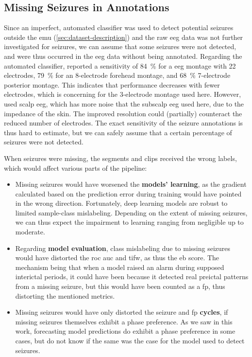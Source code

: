 \subsection{Missing Seizures in Annotations}
Since an imperfect, automated classifier was used to detect potential seizures outside the \gls{emu} (\cref{sec:dataset-description}) and the raw \gls{eeg} data was not further investigated for seizures, we can assume that some seizures were not detected, and were thus occurred in the \gls{eeg} data without being annotated.
Regarding the automated classifier, \textcite{furbass_automatic_2017} reported a sensitivity of \SI{84}{\percent} for a \gls{eeg} montage with 22 electrodes, \SI{79}{\percent} for an 8-electrode forehead montage, and \SI{68}{\percent} 7-electrode posterior montage.
This indicates that performance decreases with fewer electrodes, which is concerning for the 3-electrode montage used here.
However, \textcite{furbass_automatic_2017} used scalp \gls{eeg}, which has more noise that the subscalp \gls{eeg} used here, due to the impedance of the skin.
The improved resolution could (partially) counteract the reduced number of electrodes.
The exact sensitivity of the seizure annotations is thus hard to estimate, but we can safely assume that a certain percentage of seizures were not detected.

When seizures were missing, the segments and clips received the wrong labels, which would affect various parts of the pipeline:

\begin{itemize}
    \item Missing seizures would have worsened the \textbf{models' learning}, as the gradient calculated based on the prediction error during training would have pointed in the wrong direction.
    Fortunately, deep learning models are robust to limited sample-class mislabeling.
    Depending on the extent of missing seizures, we can thus expect the impairment to learning ranging from negligible up to moderate.

    \item Regarding \textbf{model evaluation}, class mislabeling due to missing seizures would have distorted the \gls{roc auc} and \gls{tifw}, as thus the \gls{eb} score.
    The mechanism being that when a model raised an alarm during supposed interictal periods, it could have been because it detected real preictal patterns from a missing seizure, but this would have been counted as a \gls{fp}, thus distorting the mentioned metrics.

    \item Missing seizures would have only distorted the seizure and \gls{fp} \textbf{cycles}, if missing seizures themselves exhibit a phase preference.
    As we saw in this work, forecasting model predictions do exhibit a phase preference in some cases, but do not know if the same was the case for the model used to detect seizures.
\end{itemize}


